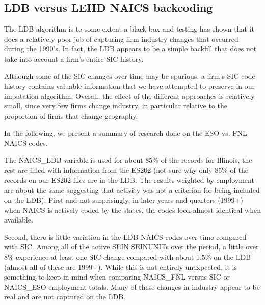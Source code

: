 \subsection{LDB versus LEHD NAICS backcoding}
\label{sec:backcoding}

The LDB algorithm is to some extent a black box and testing has shown that 
it does a relatively poor job of capturing firm industry changes that 
occurred during the 1990's. In fact, the LDB appears to be a simple
backfill that does not take into account a firm's entire SIC history.

% 

Although some of the SIC changes over time may be spurious, a firm's SIC
code history contains valuable information that we have attempted to
preserve in our imputation algorithm. Overall, the effect of the different
approaches is relatively small, since very few firms change industry, in
particular relative to the proportion of firms that change geography.


In the following, we present  a summary of research done on the ESO vs. FNL NAICS codes. 


The NAICS{\_}LDB variable is used for about 85{\%} of the records for 
Illinois, the rest are filled with information from the ES202 (not sure why 
only 85{\%} of the records on our ES202 files are in the LDB. The results 
weighted by employment are about the same suggesting that activity was not a 
criterion for being included on the LDB). First and not surprisingly, in 
later years and quarters (1999+) when NAICS is actively coded by the states, 
the codes look almost identical when available.


Second, there is little variation in the LDB NAICS codes over time compared 
with SIC. Among all of the active SEIN SEINUNITs over the period, a little 
over 8{\%} experience at least one SIC change compared with about 1.5{\%} on 
the LDB (almost all of these are 1999+). While this is not entirely 
unexpected, it is something to keep in mind when comparing NAICS{\_}FNL 
versus SIC or NAICS{\_}ESO employment totals. Many of these changes in 
industry appear to be real and are not captured on the LDB.

